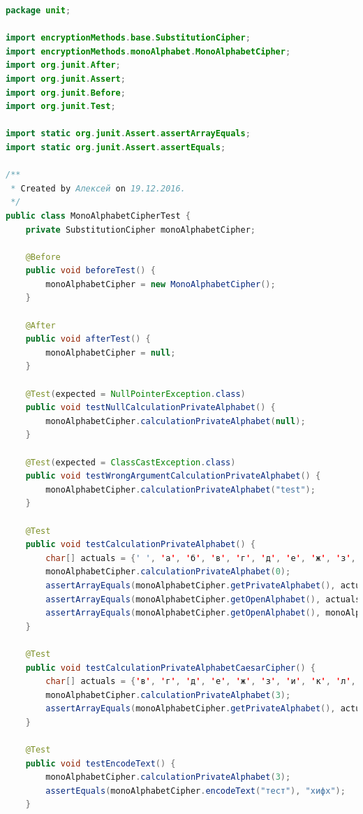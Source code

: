 \documentclass[a4paper,12pt]{article}
\begin{document}
\begin{lstlisting}[language=java, caption=код модуля MonoAlphabetCipherTest.java]
package unit;

import encryptionMethods.base.SubstitutionCipher;
import encryptionMethods.monoAlphabet.MonoAlphabetCipher;
import org.junit.After;
import org.junit.Assert;
import org.junit.Before;
import org.junit.Test;

import static org.junit.Assert.assertArrayEquals;
import static org.junit.Assert.assertEquals;

/**
 * Created by Алексей on 19.12.2016.
 */
public class MonoAlphabetCipherTest {
    private SubstitutionCipher monoAlphabetCipher;

    @Before
    public void beforeTest() {
        monoAlphabetCipher = new MonoAlphabetCipher();
    }

    @After
    public void afterTest() {
        monoAlphabetCipher = null;
    }

    @Test(expected = NullPointerException.class)
    public void testNullCalculationPrivateAlphabet() {
        monoAlphabetCipher.calculationPrivateAlphabet(null);
    }

    @Test(expected = ClassCastException.class)
    public void testWrongArgumentCalculationPrivateAlphabet() {
        monoAlphabetCipher.calculationPrivateAlphabet("test");
    }

    @Test
    public void testCalculationPrivateAlphabet() {
        char[] actuals = {' ', 'а', 'б', 'в', 'г', 'д', 'е', 'ж', 'з', 'и', 'к', 'л', 'м', 'н', 'о', 'п', 'р', 'с', 'т', 'у', 'ф', 'х', 'ц', 'ч', 'ш', 'щ', 'ъ', 'ы', 'ь', 'э', 'ю', 'я'};
        monoAlphabetCipher.calculationPrivateAlphabet(0);
        assertArrayEquals(monoAlphabetCipher.getPrivateAlphabet(), actuals);
        assertArrayEquals(monoAlphabetCipher.getOpenAlphabet(), actuals);
        assertArrayEquals(monoAlphabetCipher.getOpenAlphabet(), monoAlphabetCipher.getOpenAlphabet());
    }

    @Test
    public void testCalculationPrivateAlphabetCaesarCipher() {
        char[] actuals = {'в', 'г', 'д', 'е', 'ж', 'з', 'и', 'к', 'л', 'м', 'н', 'о', 'п', 'р', 'с', 'т', 'у', 'ф', 'х', 'ц', 'ч', 'ш', 'щ', 'ъ', 'ы', 'ь', 'э', 'ю', 'я', ' ', 'а', 'б'};
        monoAlphabetCipher.calculationPrivateAlphabet(3);
        assertArrayEquals(monoAlphabetCipher.getPrivateAlphabet(), actuals);
    }

    @Test
    public void testEncodeText() {
        monoAlphabetCipher.calculationPrivateAlphabet(3);
        assertEquals(monoAlphabetCipher.encodeText("тест"), "хифх");
    }


\end{lstlisting}
\end{document}
